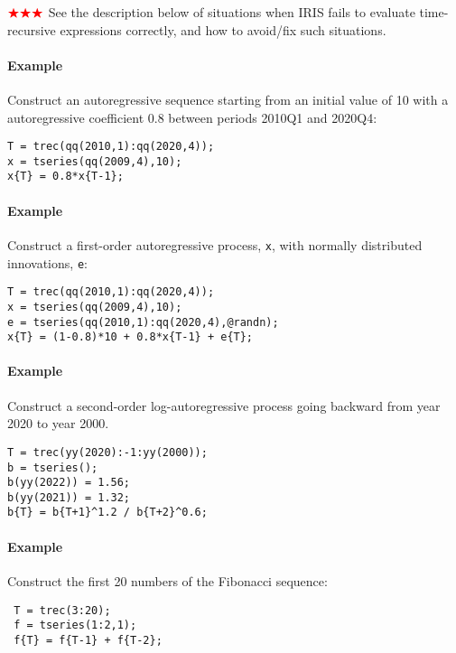 ${\color{red}\bigstar\bigstar\bigstar}$ See the description below of situations when IRIS fails to
evaluate time-recursive expressions correctly, and how to avoid/fix such
situations.

\paragraph{Example}

Construct an autoregressive sequence starting from an initial value of
10 with a autoregressive coefficient 0.8 between periods 2010Q1 and
2020Q4:

\begin{verbatim}
T = trec(qq(2010,1):qq(2020,4));
x = tseries(qq(2009,4),10);
x{T} = 0.8*x{T-1};
\end{verbatim}

\paragraph{Example}

Construct a first-order autoregressive process, \texttt{x}, with
normally distributed innovations, \texttt{e}:

\begin{verbatim}
T = trec(qq(2010,1):qq(2020,4));
x = tseries(qq(2009,4),10);
e = tseries(qq(2010,1):qq(2020,4),@randn);
x{T} = (1-0.8)*10 + 0.8*x{T-1} + e{T};
\end{verbatim}

\paragraph{Example}

Construct a second-order log-autoregressive process going backward from
year 2020 to year 2000.

\begin{verbatim}
T = trec(yy(2020):-1:yy(2000));
b = tseries();
b(yy(2022)) = 1.56;
b(yy(2021)) = 1.32;
b{T} = b{T+1}^1.2 / b{T+2}^0.6;
\end{verbatim}

\paragraph{Example}

Construct the first 20 numbers of the Fibonacci sequence:

\begin{verbatim}
 T = trec(3:20);
 f = tseries(1:2,1);
 f{T} = f{T-1} + f{T-2};
\end{verbatim}

